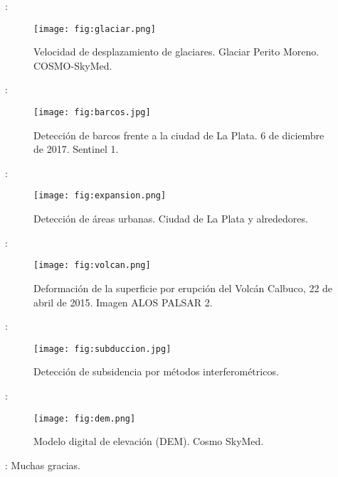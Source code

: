\begin{frame}{\secname : \subsecname}
  \begin{figure}
    \centering
    \texttt{[image: fig:glaciar.png]}
    \caption{Velocidad de desplazamiento de glaciares. Glaciar Perito Moreno. COSMO-SkyMed.}
    \label{}
  \end{figure}
\end{frame}

\begin{frame}{\secname : \subsecname}
  \begin{figure}
    \centering
    \texttt{[image: fig:barcos.jpg]}
    \caption{Detección de barcos frente a la ciudad de La Plata. 6 de diciembre de 2017. Sentinel 1.}
    \label{}
  \end{figure}
\end{frame}

\begin{frame}{\secname : \subsecname}
  \begin{figure}
    \centering
    \texttt{[image: fig:expansion.png]}
    \caption{Detección de áreas urbanas. Ciudad de La Plata y alrededores.}
    \label{}
  \end{figure}
\end{frame}

\begin{frame}{\secname : \subsecname}
  \begin{figure}
    \centering
    \texttt{[image: fig:volcan.png]}
    \caption{Deformación de la superficie por erupción del Volcán Calbuco, 22 de abril de 2015. Imagen ALOS PALSAR 2.}
    \label{}
  \end{figure}
\end{frame}

\begin{frame}{\secname : \subsecname}
  \begin{figure}
    \centering
    \texttt{[image: fig:subduccion.jpg]}
    \caption{Detección de subsidencia por métodos interferométricos.}
    \label{}
  \end{figure}
\end{frame}

\begin{frame}{\secname : \subsecname}
  \begin{figure}
    \centering
    \texttt{[image: fig:dem.png]}
    \caption{Modelo digital de elevación (DEM). Cosmo SkyMed.}
    \label{}
  \end{figure}
\end{frame}


\begin{frame}{\secname : \subsecname}
Muchas gracias.
\end{frame}
